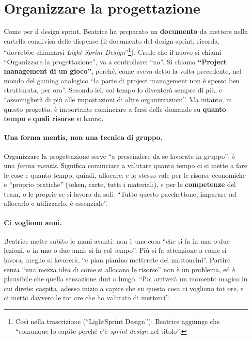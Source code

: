 \section{Organizzare la progettazione}
\label{a9:sec:organizzare}

Come per il design sprint, Beatrice ha preparato un \textbf{documento} da mettere
nella cartella condivisa delle dispense (il documento del design sprint, ricorda,
``dovrebbe chiamarsi \emph{Light Sprint Design}''\footnote{Così nella trascrizione
(``LightSprint Design''); Beatrice aggiunge che ``comunque lo capite perché c'è
\emph{sprint design} nel titolo''.}). Crede che il nuovo si chiami ``Organizzare la
progettazione'', va a controllare: ``no''. Si chiama \textbf{``Project management di
un gioco''}, perché, come aveva detto la volta precedente, nel mondo del gaming
analogico ``la parte di project management non è spesso ben strutturata, per ora''.
Secondo lei, col tempo lo diventerà sempre di più, e ``assomiglierà di più alle
impostazioni di altre organizzazioni''. Ma intanto, in questo progetto, è importante
cominciare a farsi delle domande su \textbf{quanto tempo} e \textbf{quali risorse} si
hanno.

\paragraph{Una forma mentis, non una tecnica di gruppo.} Organizzare la progettazione
serve ``a prescindere da se lavorate in gruppo'': è una \emph{forma mentis}.
Significa cominciare a valutare quanto tempo ci si mette a fare le cose e quanto tempo,
quindi, allocare; e lo stesso vale per le risorse economiche e ``proprio pratiche''
(token, carte, tutti i materiali), e per le \textbf{competenze} del team, o le
proprie se si lavora da soli. ``Tutto questo pacchettone, imparare ad allocarlo e
utilizzarlo, è essenziale''.

\paragraph{Ci vogliono anni.} Beatrice mette subito le mani avanti: non è una cosa
``che si fa in una o due lezioni, o in uno o due anni: si fa col tempo''. Più si fa
attenzione a come si lavora, meglio si lavorerà, ``e pian pianino metterete dei
mattoncini''. Partire senza ``una mezza idea di come si allocano le risorse'' non è un
problema, ed è plausibile che quella sensazione duri a lungo. ``Poi arriverà un
momento magico in cui direte: caspita, adesso inizio a capire che su questa cosa ci
vogliono tot ore, e ci metto davvero le tot ore che ho valutato di metterci''.

